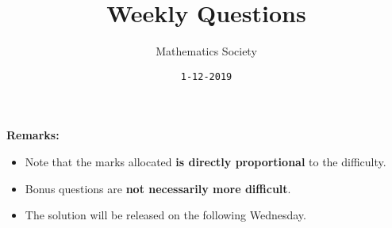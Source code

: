 \documentclass[addpoints]{exam}
\title{Weekly Questions}
\author{Mathematics Society}
\date{\texttt{1-12-2019}}
\begin{document}


\maketitle


\textbf{Remarks:}
\begin{itemize}
    \item Note that the marks allocated \textbf{is directly proportional} to the difficulty.
    \item Bonus questions are \textbf{not necessarily more difficult}.
    \item The solution will be released on the following Wednesday.
\end{itemize}



\end{document}
